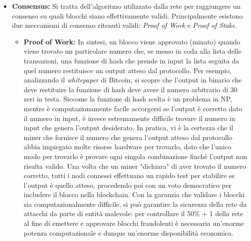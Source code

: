 \documentclass[a4paper, 12pt]{article}
\begin{document}
\begin{itemize}

\item \textbf{Consensus: }
Si tratta dell'algoritmo utilizzato dalla rete per raggiungere un consenso su quali blocchi siano effettivamente validi.
Principalmente esistono due meccanismi di consenso ritenuti validi: \textit{Proof of Work} e \textit{Proof of Stake}.

\begin{itemize}
    \item \textbf{Proof of Work: }
    In sintesi, un blocco viene approvato (minato) quando viene trovato un particolare numero che, se messo in coda alla lista delle transazioni, una funzione di hash che prende
    in input la lista seguita da quel numero restituisce un output atteso dal protocollo. Per esempio, analizzando il \textit{whitepaper} di Bitcoin, si scopre che
    l'output in binario che deve restituire la funzione di hash deve avere il numero arbitrario di 30 zeri in testa.
    Siccome la funzione di hash scelta è un problema in NP, mentre è computazionamente facile accorgersi se l'output è corretto dato il numero in input, è invece estremamente difficile
    trovare il numero in input che genera l'output desiderato. In pratica, vi è la certezza che il miner che fornisce il numero che genera l'output atteso dal protocollo
    abbia impiegato molte risorse hardware per trovarlo, dato che l'unico modo per trovarlo è provare ogni singola combinazione finchè l'output non risulta valido.
    Una volta che un miner "dichiara" di aver trovato il numero corretto, tutti i nodi connessi effettuano un rapido test per stabilire se l'output è quello atteso, procedendo
    poi con un voto democratico per includere il blocco nella blockchain.
    Con la garanzia che validare i blocchi sia computazionalmente difficile, si può garantire la sicurezza della rete da attacchi da parte di entità malevole: per controllare il 50\% + 1 della
    rete al fine di emettere e approvare blocchi fraudolenti è necessaria un'enorme potenza computazionale e dunque un'enorme disponibilità economica.\\


\end{itemize}
\end{itemize}
\end{document}
